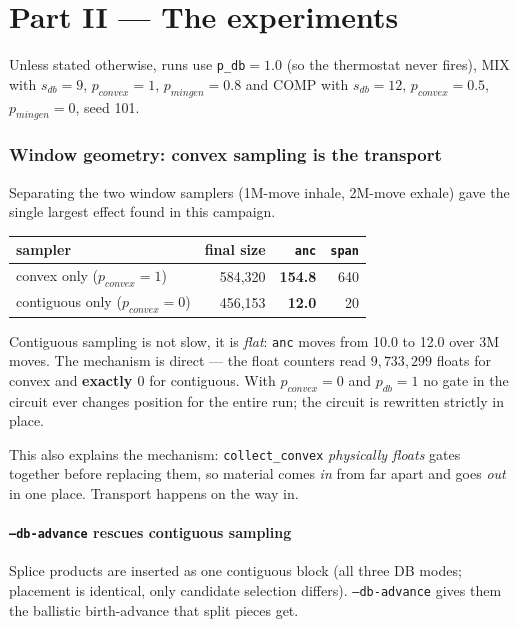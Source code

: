 \documentclass[11pt]{article}
\begin{document}
\part*{Part II --- The experiments}

Unless stated otherwise, runs use \texttt{p\_db}$=1.0$ (so the thermostat never
fires), MIX with $s_{db}=9$, $p_{convex}=1$, $p_{mingen}=0.8$ and COMP with
$s_{db}=12$, $p_{convex}=0.5$, $p_{mingen}=0$, seed 101.

\section{Window geometry: convex sampling is the transport}

Separating the two window samplers (1M-move inhale, 2M-move exhale) gave the
single largest effect found in this campaign.

\begin{center}
\begin{tabular}{lrrr}
\toprule
sampler & final size & \texttt{anc} & \texttt{span} \\
\midrule
convex only ($p_{convex}=1$)     & 584{,}320 & \textbf{154.8} & 640 \\
contiguous only ($p_{convex}=0$) & 456{,}153 & \textbf{12.0}  & 20  \\
\bottomrule
\end{tabular}
\end{center}

Contiguous sampling is not slow, it is \emph{flat}: \texttt{anc} moves from 10.0
to 12.0 over 3M moves. The mechanism is direct --- the float counters read
$9{,}733{,}299$ floats for convex and \textbf{exactly $0$} for contiguous. With
$p_{convex}=0$ and $p_{db}=1$ no gate in the circuit ever changes position for
the entire run; the circuit is rewritten strictly in place.

This also explains the mechanism: \texttt{collect\_convex} \emph{physically
floats} gates together before replacing them, so material comes \emph{in} from
far apart and goes \emph{out} in one place. Transport happens on the way in.

\subsection{\texttt{--db-advance} rescues contiguous sampling}

Splice products are inserted as one contiguous block (all three DB modes;
placement is identical, only candidate selection differs). \texttt{--db-advance}
gives them the ballistic birth-advance that split pieces get.
\end{document}
